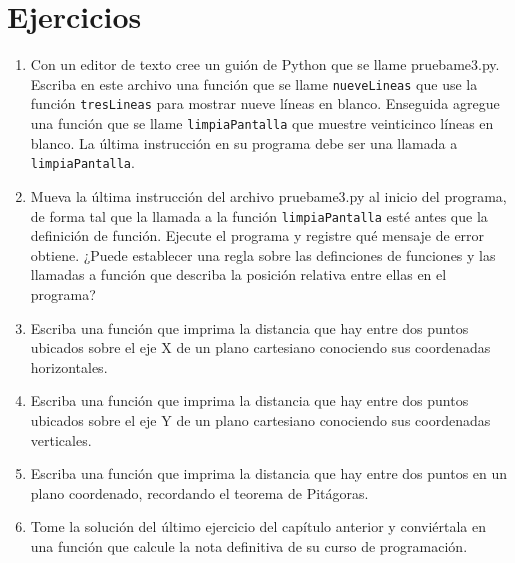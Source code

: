 \section{Ejercicios}
\begin{enumerate}

 \item Con un editor de texto cree un guión de Python que se llame pruebame3.py. Escriba en este 
 archivo una función que se llame \verb+nueveLineas+ que use la función \verb+tresLineas+ para mostrar nueve líneas 
 en blanco. Enseguida agregue una función que se llame \verb+limpiaPantalla+ que muestre veinticinco líneas en 
 blanco. La última instrucción en su programa debe ser una llamada a \verb+limpiaPantalla+.
 
 \item Mueva la última instrucción del archivo pruebame3.py al inicio del programa, de forma tal que la llamada a la 
 función \verb+limpiaPantalla+ esté antes que la definición de función. Ejecute el programa y registre qué mensaje de 
 error obtiene. ¿Puede establecer una regla sobre las definciones de funciones y las llamadas a función que describa 
 la posición relativa entre ellas en el programa?
 
 \item Escriba una función que imprima la distancia que hay entre dos puntos ubicados sobre el eje X de un plano 
 cartesiano conociendo sus coordenadas horizontales.
 
 \item Escriba una función que imprima la distancia que hay entre dos puntos ubicados sobre el eje Y de un plano 
 cartesiano conociendo sus coordenadas verticales.
 
 \item Escriba una función que imprima la distancia que hay entre dos puntos en un plano coordenado, recordando el teorema
 de Pitágoras.
 
 \item Tome la solución del último ejercicio del capítulo anterior y conviértala en una función que calcule la nota 
 definitiva de su curso de programación.
 
\end{enumerate}
